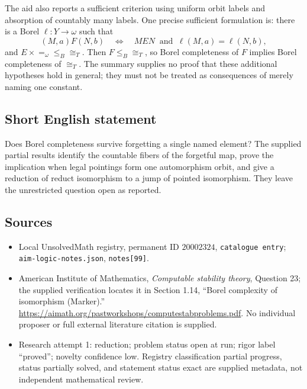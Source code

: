 \documentclass[11pt]{article}
\begin{document}
The aid also reports a sufficient criterion using uniform orbit labels and absorption of countably many labels. One precise sufficient formulation is: there is a Borel $\ell:Y\to\omega$ such that
\[
(M,a)F(N,b)\quad\Longleftrightarrow\quad
M E N\ \text{ and }\ \ell(M,a)=\ell(N,b),
\]
and $E\times =_\omega\leq_B\cong_T$. Then $F\leq_B\cong_T$, so Borel completeness of $F$ implies Borel completeness of $\cong_T$. The summary supplies no proof that these additional hypotheses hold in general; they must not be treated as consequences of merely naming one constant.
\subsection{Short English statement}
Does Borel completeness survive forgetting a single named element? The supplied partial results identify the countable fibers of the forgetful map, prove the implication when legal pointings form one automorphism orbit, and give a reduction of reduct isomorphism to a jump of pointed isomorphism. They leave the unrestricted question open as reported.
\subsection{Sources}
\begin{itemize}
\item Local UnsolvedMath registry, permanent ID $20002324$, \texttt{catalogue entry}; \texttt{aim-logic-notes.json}, \texttt{notes[99]}.
\item American Institute of Mathematics, \emph{Computable stability theory}, Question 23; the supplied verification locates it in Section 1.14, ``Borel complexity of isomorphism (Marker).'' \url{https://aimath.org/pastworkshops/computestabproblems.pdf}. No individual proposer or full external literature citation is supplied.
\item Research attempt 1: reduction; problem status open at run; rigor label ``proved''; novelty confidence low. Registry classification partial progress, status partially solved, and statement status exact are supplied metadata, not independent mathematical review.
\end{itemize}
\end{document}
